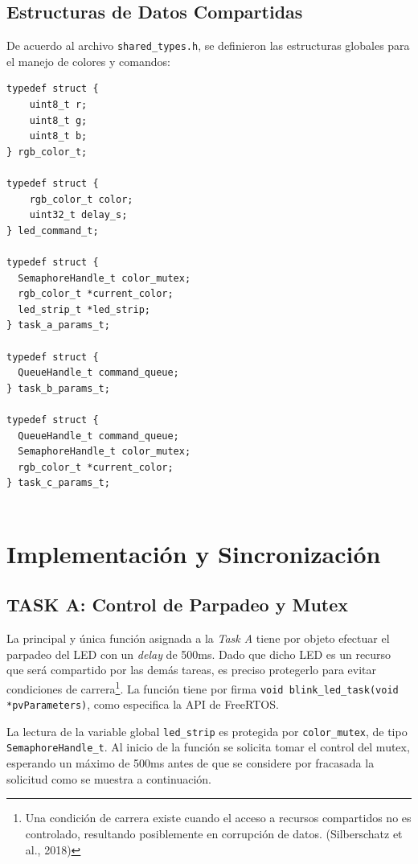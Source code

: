 \documentclass[12pt,letterpaper]{article}
\begin{document}
\subsection{Estructuras de Datos Compartidas}
De acuerdo al archivo \texttt{shared\_types.h}, se definieron las estructuras globales para el manejo de colores y comandos:

\begin{lstlisting}
typedef struct {
    uint8_t r;
    uint8_t g;
    uint8_t b;
} rgb_color_t;

typedef struct {
    rgb_color_t color;
    uint32_t delay_s;
} led_command_t;

typedef struct {
  SemaphoreHandle_t color_mutex;
  rgb_color_t *current_color; 
  led_strip_t *led_strip;
} task_a_params_t;

typedef struct {
  QueueHandle_t command_queue;
} task_b_params_t;

typedef struct {
  QueueHandle_t command_queue;
  SemaphoreHandle_t color_mutex;
  rgb_color_t *current_color;
} task_c_params_t;


\end{lstlisting}

\section{Implementación y Sincronización}

\subsection{TASK A: Control de Parpadeo y Mutex}

La principal y única función asignada a la \textit{Task A} tiene por objeto efectuar el parpadeo del LED con un \textit{delay} de 500ms. Dado que dicho LED es un recurso que será compartido por las demás tareas, es preciso protegerlo para evitar condiciones de carrera\footnote{Una condición de carrera existe cuando el acceso a recursos compartidos no es controlado, resultando posiblemente en corrupción de datos. (Silberschatz et al., 2018)}. La función tiene por firma \texttt{void blink\_led\_task(void *pvParameters)}, como especifica la API de FreeRTOS.

La lectura de la variable global \texttt{led\_strip} es protegida por \texttt{color\_mutex}, de tipo \texttt{SemaphoreHandle\_t}. Al inicio de la función se solicita tomar el control del mutex, esperando un máximo de 500ms antes de que se considere por fracasada la solicitud como se muestra a continuación.
\end{document}
